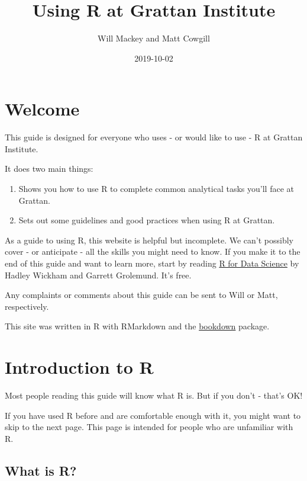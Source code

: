 \documentclass[]{book}
\title{Using R at Grattan Institute}
\author{Will Mackey and Matt Cowgill}
\date{2019-10-02}
\providecommand{\tightlist}{%
  \setlength{\itemsep}{0pt}\setlength{\parskip}{0pt}}
\begin{document}
\maketitle

{
\setcounter{tocdepth}{1}
\tableofcontents
}
\hypertarget{welcome}{%
\chapter*{Welcome}\label{welcome}}

This guide is designed for everyone who uses - or would like to use - R at Grattan Institute.

It does two main things:

\begin{enumerate}
\def\labelenumi{\arabic{enumi}.}
\tightlist
\item
  Shows you how to use R to complete common analytical tasks you'll face at Grattan.
\item
  Sets out some guidelines and good practices when using R at Grattan.
\end{enumerate}

As a guide to using R, this website is helpful but incomplete. We can't possibly cover - or anticipate - all the skills you might need to know. If you make it to the end of this guide and want to learn more, start by reading \href{https://r4ds.had.co.nz}{R for Data Science} by Hadley Wickham and Garrett Grolemund. It's free.

Any complaints or comments about this guide can be sent to Will or Matt, respectively.

This site was written in R with RMarkdown and the \href{https://bookdown.org}{bookdown} package.

\hypertarget{introduction-to-r}{%
\chapter{Introduction to R}\label{introduction-to-r}}

Most people reading this guide will know what R is. But if you don't - that's OK!

If you have used R before and are comfortable enough with it, you might want to skip to the next page. This page is intended for people who are unfamiliar with R.

\hypertarget{what-is-r}{%
\section{What is R?}\label{what-is-r}}
\end{document}
